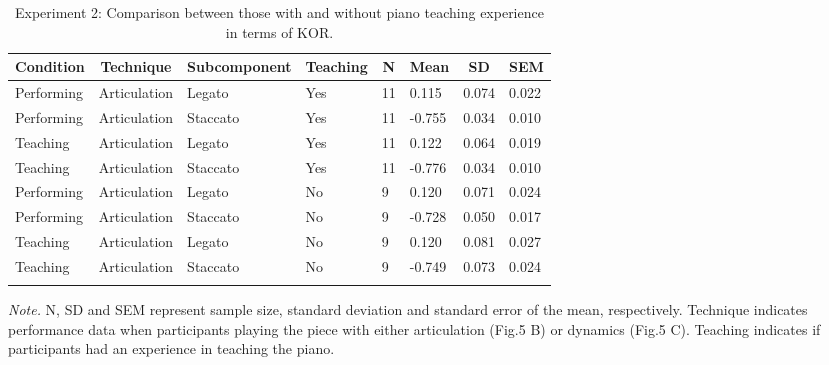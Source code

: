 \documentclass[
  man,floatsintext]{apa6}
\begin{document}
\begin{table}[tbp]

\begin{center}
\begin{threeparttable}

\caption{\label{tab:art-teaching-desc-2}Experiment 2: Comparison between those with and without piano teaching experience in terms of KOR.}

\begin{tabular}{llllllll}
\toprule
Condition & \multicolumn{1}{c}{Technique} & \multicolumn{1}{c}{Subcomponent} & \multicolumn{1}{c}{Teaching} & \multicolumn{1}{c}{N} & \multicolumn{1}{c}{Mean} & \multicolumn{1}{c}{SD} & \multicolumn{1}{c}{SEM}\\
\midrule
Performing & Articulation & Legato & Yes & 11 & 0.115 & 0.074 & 0.022\\
Performing & Articulation & Staccato & Yes & 11 & -0.755 & 0.034 & 0.010\\
Teaching & Articulation & Legato & Yes & 11 & 0.122 & 0.064 & 0.019\\
Teaching & Articulation & Staccato & Yes & 11 & -0.776 & 0.034 & 0.010\\
Performing & Articulation & Legato & No & 9 & 0.120 & 0.071 & 0.024\\
Performing & Articulation & Staccato & No & 9 & -0.728 & 0.050 & 0.017\\
Teaching & Articulation & Legato & No & 9 & 0.120 & 0.081 & 0.027\\
Teaching & Articulation & Staccato & No & 9 & -0.749 & 0.073 & 0.024\\
\bottomrule
\addlinespace
\end{tabular}

\begin{tablenotes}[para]
\normalsize{\textit{Note.} N, SD and SEM represent sample size, standard deviation and standard error of the mean, respectively. Technique indicates performance data when participants playing the piece with either articulation (Fig.5 B) or dynamics (Fig.5 C). Teaching indicates if participants had an experience in teaching the piano.}
\end{tablenotes}

\end{threeparttable}
\end{center}

\end{table}
\end{document}
